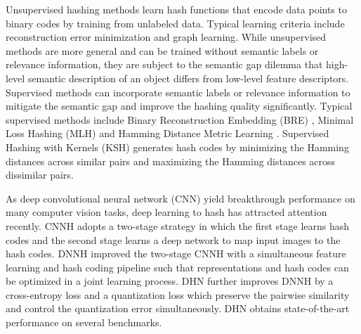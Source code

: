 \documentclass[10pt,twocolumn,letterpaper]{article}
\begin{document}
Unsupervised hashing methods learn hash functions that encode data points to binary codes by training from unlabeled data. Typical learning criteria include reconstruction error minimization \cite{cite:AI07SemanticHashing,cite:CVPR11ITQ,cite:TPAMI11PQ} and graph learning\cite{cite:NIPS09SH,cite:ICML11AGH}. While unsupervised methods are more general and can be trained without semantic labels or relevance information, they are subject to the semantic gap dilemma \cite{cite:TPAMI00SemanticGap} that high-level semantic description of an object differs from low-level feature descriptors. Supervised methods can incorporate semantic labels or relevance information to mitigate the semantic gap and improve the hashing quality significantly. 
Typical supervised methods include Binary Reconstruction Embedding (BRE) \cite{cite:NIPS09BRE}, Minimal Loss Hashing (MLH) \cite{cite:ICML11MLH} and Hamming Distance Metric Learning \cite{cite:NIPS12HDML}.
Supervised Hashing with Kernels (KSH) \cite{cite:CVPR12KSH} generates hash codes by minimizing the Hamming distances across similar pairs and maximizing the Hamming distances across dissimilar pairs.

As deep convolutional neural network (CNN) \cite{cite:NIPS12CNN,cite:CVPR16DRL} yield breakthrough performance on many computer vision tasks, deep learning to hash has attracted attention recently. CNNH \cite{cite:AAAI14CNNH} adopts a two-stage strategy in which the first stage learns hash codes and the second stage learns a deep network to map input images to the hash codes. DNNH \cite{cite:CVPR15DNNH} improved the two-stage CNNH with a simultaneous feature learning and hash coding  pipeline such that representations and hash codes can be optimized in a joint learning process. DHN \cite{cite:AAAI16DHN} further improves DNNH by a cross-entropy loss and a quantization loss which preserve the pairwise similarity and control the quantization error simultaneously. DHN obtains state-of-the-art performance on several benchmarks.
\end{document}
